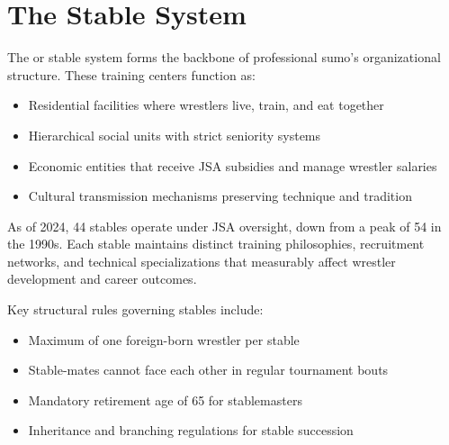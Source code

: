 \section{The Stable System}

The  or stable system forms the backbone of professional sumo's organizational structure. These training centers function as:
\begin{itemize}
\item Residential facilities where wrestlers live, train, and eat together
\item Hierarchical social units with strict seniority systems
\item Economic entities that receive JSA subsidies and manage wrestler salaries
\item Cultural transmission mechanisms preserving technique and tradition
\end{itemize}

As of 2024, 44 stables operate under JSA oversight, down from a peak of 54 in the 1990s. Each stable maintains distinct training philosophies, recruitment networks, and technical specializations that measurably affect wrestler development and career outcomes.

Key structural rules governing stables include:
\begin{itemize}
\item Maximum of one foreign-born wrestler per stable
\item Stable-mates cannot face each other in regular tournament bouts
\item Mandatory retirement age of 65 for stablemasters
\item Inheritance and branching regulations for stable succession
\end{itemize}